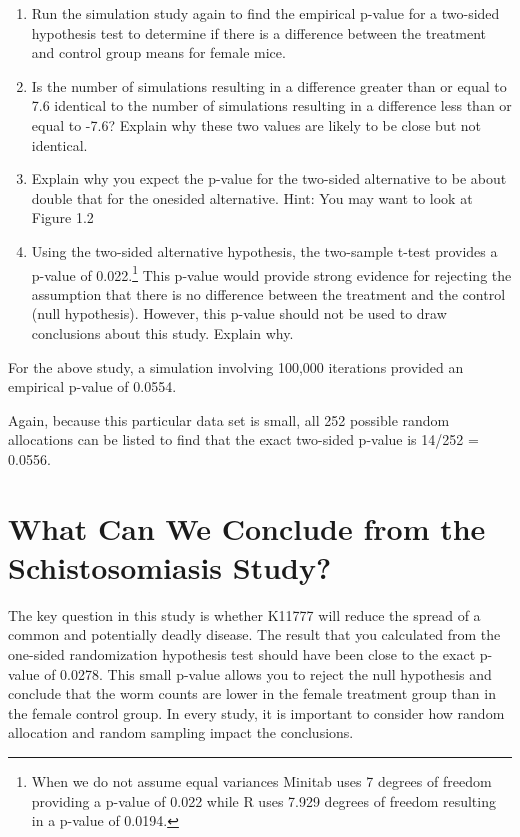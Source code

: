 \documentclass[
]{report}
\providecommand{\tightlist}{%
  \setlength{\itemsep}{0pt}\setlength{\parskip}{0pt}}
\begin{document}
\begin{enumerate}
\def\labelenumi{\arabic{enumi}.}
\setcounter{enumi}{12}
\tightlist
\item
  Run the simulation study again to find the empirical p-value for a two-sided hypothesis test to determine
  if there is a difference between the treatment and control group means for female mice.
\item
  Is the number of simulations resulting in a difference greater than or equal to 7.6 identical to the number
  of simulations resulting in a difference less than or equal to -7.6? Explain why these two values
  are likely to be close but not identical.
\item
  Explain why you expect the p-value for the two-sided alternative to be about double that for the onesided
  alternative. Hint: You may want to look at Figure 1.2
\item
  Using the two-sided alternative hypothesis, the two-sample t-test provides a p-value of 0.022.\footnote{When we do not assume equal variances Minitab uses 7 degrees of freedom providing a p-value of 0.022 while R uses
    7.929 degrees of freedom resulting in a p-value of 0.0194.} This
  p-value would provide strong evidence for rejecting the assumption that there is no difference between
  the treatment and the control (null hypothesis). However, this p-value should not be used to draw
  conclusions about this study. Explain why.
\end{enumerate}

For the above study, a simulation involving 100,000 iterations provided an empirical p-value of 0.0554.

Again, because this particular data set is small, all 252 possible random allocations can be listed to find that
the exact two-sided p-value is 14/252 = 0.0556.

\section{\texorpdfstring{\textbf{What Can We Conclude from the Schistosomiasis Study?}}{What Can We Conclude from the Schistosomiasis Study?}}\label{what-can-we-conclude-from-the-schistosomiasis-study}

The key question in this study is whether K11777 will reduce the spread of a common and potentially deadly
disease. The result that you calculated from the one-sided randomization hypothesis test should have been
close to the exact p-value of 0.0278. This small p-value allows you to reject the null hypothesis and conclude
that the worm counts are lower in the female treatment group than in the female control group. In every study,
it is important to consider how random allocation and random sampling impact the conclusions.
\end{document}
